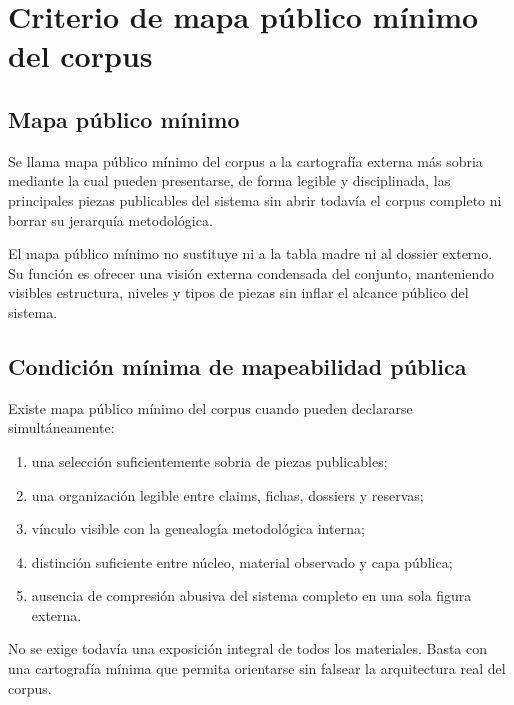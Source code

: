 \chapter{Criterio de mapa público mínimo del corpus}

\section{Mapa público mínimo}
\begin{definition}
Se llama mapa público mínimo del corpus a la cartografía externa más sobria mediante la cual pueden presentarse, de forma legible y disciplinada, las principales piezas publicables del sistema sin abrir todavía el corpus completo ni borrar su jerarquía metodológica.
\end{definition}

\begin{observation}
El mapa público mínimo no sustituye ni a la tabla madre ni al dossier externo. Su función es ofrecer una visión externa condensada del conjunto, manteniendo visibles estructura, niveles y tipos de piezas sin inflar el alcance público del sistema.
\end{observation}

\section{Condición mínima de mapeabilidad pública}
\begin{definition}
Existe mapa público mínimo del corpus cuando pueden declararse simultáneamente:
\begin{enumerate}
  \item una selección suficientemente sobria de piezas publicables;
  \item una organización legible entre claims, fichas, dossiers y reservas;
  \item vínculo visible con la genealogía metodológica interna;
  \item distinción suficiente entre núcleo, material observado y capa pública;
  \item ausencia de compresión abusiva del sistema completo en una sola figura externa.
\end{enumerate}
\end{definition}

\begin{observation}
No se exige todavía una exposición integral de todos los materiales. Basta con una cartografía mínima que permita orientarse sin falsear la arquitectura real del corpus.
\end{observation}

